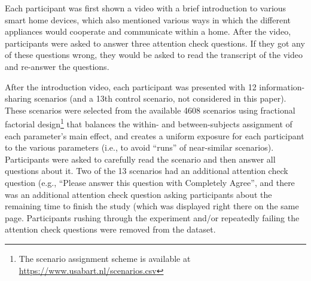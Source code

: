 Each participant was first shown a video with a brief introduction to various smart home devices, which also mentioned various ways in which the different appliances would cooperate and communicate within a home. After the video, participants were asked to answer three attention check questions. If they got any of these questions wrong, they would be asked to read the transcript of the video and re-answer the questions.

After the introduction video, each participant was presented with 12 information-sharing scenarios (and a 13th control scenario, not considered in this paper). These scenarios were selected from the available 4608 scenarios using fractional factorial design\footnote{The scenario assignment scheme is available at \url{https://www.usabart.nl/scenarios.csv}} that balances the within- and between-subjects assignment of each parameter's main effect, and creates a uniform exposure for each participant to the various parameters (i.e., to avoid ``runs'' of near-similar scenarios). Participants were asked to carefully read the scenario and then answer all questions about it. Two of the 13 scenarios had an additional attention check question (e.g., ``Please answer this question with Completely Agree'', and there was an additional attention check question asking participants about the remaining time to finish the study (which was displayed right there on the same page. Participants rushing through the experiment and/or repeatedly failing the attention check questions were removed from the dataset.
%
%
